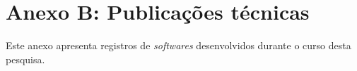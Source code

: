 \chapter{Anexo B: Publicações técnicas}
\label{an:b}


Este anexo apresenta registros de \emph{softwares} desenvolvidos durante o curso desta pesquisa.


